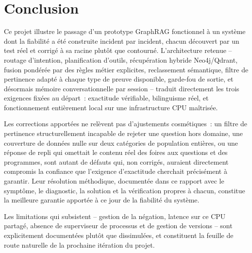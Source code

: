 \section{Conclusion}

Ce projet illustre le passage d'un prototype GraphRAG fonctionnel à un système dont la fiabilité a été construite incident par incident, chacun découvert par un test réel et corrigé à sa racine plutôt que contourné. L'architecture retenue -- routage d'intention, planification d'outils, récupération hybride Neo4j/Qdrant, fusion pondérée par des règles métier explicites, reclassement sémantique, filtre de pertinence adapté à chaque type de preuve disponible, garde-fou de sortie, et désormais mémoire conversationnelle par session -- traduit directement les trois exigences fixées au départ~: exactitude vérifiable, bilinguisme réel, et fonctionnement entièrement local sur une infrastructure CPU maîtrisée.

Les corrections apportées ne relèvent pas d'ajustements cosmétiques~: un filtre de pertinence structurellement incapable de rejeter une question hors domaine, une couverture de données nulle sur deux catégories de population entières, ou une réponse de repli qui omettait le contenu réel des foires aux questions et des programmes, sont autant de défauts qui, non corrigés, auraient directement compromis la confiance que l'exigence d'exactitude cherchait précisément à garantir. Leur résolution méthodique, documentée dans ce rapport avec le symptôme, le diagnostic, la solution et la vérification propres à chacun, constitue la meilleure garantie apportée à ce jour de la fiabilité du système.

Les limitations qui subsistent -- gestion de la négation, latence sur ce CPU partagé, absence de superviseur de processus et de gestion de versions -- sont explicitement documentées plutôt que dissimulées, et constituent la feuille de route naturelle de la prochaine itération du projet.

